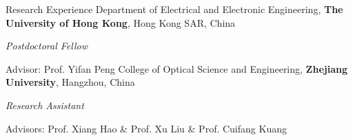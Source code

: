 \begin{rubric}{Research Experience}
	\entry*[2024/04 -- Present]%
	Department of Electrical and Electronic Engineering, \textbf{The University of Hong Kong}, Hong Kong SAR, China
	\par \textit{Postdoctoral Fellow}
	\par Advisor: Prof. Yifan Peng
    \entry*[2024/01 -- 2024/03]%
	College of Optical Science and Engineering, \textbf{Zhejiang University}, Hangzhou, China
	\par \textit{Research Assistant}
	\par Advisors: Prof. Xiang Hao \& Prof. Xu Liu \& Prof. Cuifang Kuang
\end{rubric}
